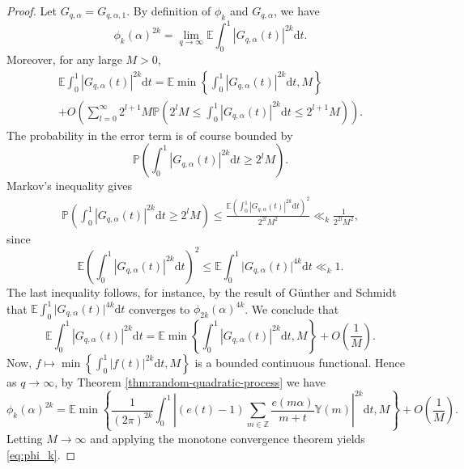 \documentclass[12pt, a4paper]{amsart}
\theoremstyle{remark}
\newcommand{\ud}{\mathrm{d}}
\newcommand{\bY}{\mathbb{Y}}
\begin{document}
\begin{proof}
    Let $G_{q,\alpha} = G_{q,\alpha,1}$.
By definition of $\phi_k$ and $G_{q, \alpha}$, we have
\begin{equation*}
    \phi_k(\alpha)^{2k} = \lim_{q\to\infty} \mathbb E \int_0^1\left\lvert G_{q, \alpha}(t) \right\rvert^{2k}\ud t.
\end{equation*}
Moreover, for any large $M>0$,
\begin{multline*}
\mathbb E \int_0^1\left\lvert G_{q, \alpha}(t) \right\rvert^{2k}\ud t = \mathbb E \min\left\{\int_0^1\left\lvert G_{q, \alpha}(t) \right\rvert^{2k}\ud t, M\right\}  \\ +  O\left(\sum_{l=0}^\infty 2^{l+1}M\mathbb P\left(2^lM\leq \int_0^1\left\lvert G_{q, \alpha}(t) \right\rvert^{2k}\ud t  \leq 2^{l+1}M\right) \right).
\end{multline*}
The probability in the error term is of course bounded by 
\[
    \mathbb P\left(\int_0^1\left\lvert G_{q, \alpha}(t) \right\rvert^{2k}\ud t \ge 2^lM  \right).
\]
Markov's inequality gives
\begin{align*}
    \mathbb P\left(\int_0^1\left\lvert G_{q, \alpha}(t) \right\rvert^{2k}\ud t \ge 2^lM \right)
    \leq \frac{\mathbb E \left(\int_0^1\left\lvert G_{q, \alpha}(t) \right\rvert^{2k}\ud t  \right)^2}{2^{2l}M^2}
    \ll_k \frac{1}{2^{2l}M^2}, 
\end{align*} 
since
\begin{equation*}
  \mathbb E \left(\int_0^1\left\lvert G_{q, \alpha}(t) \right\rvert^{2k}\ud t  \right)^2\leq \mathbb E\int_0^1 \lvert G_{q, \alpha}(t)\rvert^{4k}\ud t\ll_k 1.  
\end{equation*}
The last inequality follows, for instance, by the result of G\"unther and Schmidt that $\mathbb E\int_0^1 \lvert G_{q, \alpha}(t)\rvert^{4k}\ud t$ converges to $\phi_{2k}(\alpha)^{4k}$. We conclude that 
\begin{equation*}
    \mathbb E \int_0^1\left\lvert G_{q, \alpha}(t) \right\rvert^{2k}\ud t = \mathbb E \min\left\{\int_0^1\left\lvert G_{q, \alpha}(t) \right\rvert^{2k}\ud t, M\right\} + O\left(\frac{1}{M} \right).
\end{equation*}
Now, $f\mapsto \min\left\{\int_0^1\left\lvert f(t) \right\rvert^{2k}\ud t, M\right\}$
is a bounded continuous functional. Hence as $q\to\infty$, by Theorem
\ref{thm:random-quadratic-process} we have 
\begin{equation*}
    \phi_k(\alpha)^{2k} = \mathbb E\min\left\{\frac{1}{(2\pi)^{2k}}
    \int_0^1
        \left\lvert(e(t)-1)\sum_{m\in\mathbb Z}
        \frac{e(m\alpha)}{m+t}\bY(m)\right\rvert^{2k}\ud t, M\right\} + O\left(\frac{1}{M} \right).
\end{equation*}
Letting $M\to\infty$ and applying the monotone convergence theorem yields \eqref{eq:phi_k}.
\end{proof}
\end{document}
